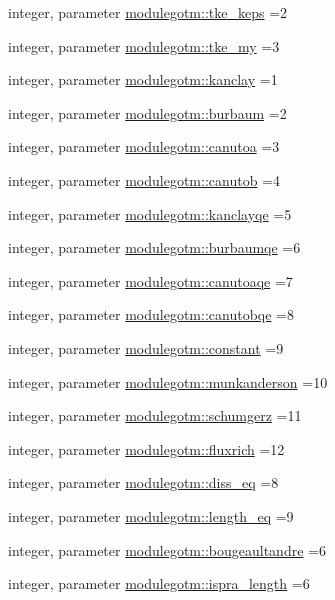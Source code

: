 \begin{DoxyCompactItemize}
integer, parameter \mbox{\hyperlink{namespacemodulegotm_af7d3b24a327afe4fa750141548a9e5f8}{modulegotm\+::tke\+\_\+keps}} =2
\item 
integer, parameter \mbox{\hyperlink{namespacemodulegotm_aed350ab9bde0bdf934d954e5c261a039}{modulegotm\+::tke\+\_\+my}} =3
\item 
integer, parameter \mbox{\hyperlink{namespacemodulegotm_abce18d4dc4ce96034c9b581092bd7970}{modulegotm\+::kanclay}} =1
\item 
integer, parameter \mbox{\hyperlink{namespacemodulegotm_a9ee68515a5fff9c9166a6b82ed456933}{modulegotm\+::burbaum}} =2
\item 
integer, parameter \mbox{\hyperlink{namespacemodulegotm_a08f200dfeb5a1b203cdf3f9887ec48f0}{modulegotm\+::canutoa}} =3
\item 
integer, parameter \mbox{\hyperlink{namespacemodulegotm_ac0ab48f659edad60f836fc9e986a8fec}{modulegotm\+::canutob}} =4
\item 
integer, parameter \mbox{\hyperlink{namespacemodulegotm_a2b67d69c6a8ac1632483b71fcbc9c20a}{modulegotm\+::kanclayqe}} =5
\item 
integer, parameter \mbox{\hyperlink{namespacemodulegotm_acc6f8d4ca9ecc05782e1e5fe37b2a4ea}{modulegotm\+::burbaumqe}} =6
\item 
integer, parameter \mbox{\hyperlink{namespacemodulegotm_a91892f852a1a0e7dbdd26d799d01d3c2}{modulegotm\+::canutoaqe}} =7
\item 
integer, parameter \mbox{\hyperlink{namespacemodulegotm_a1adf4ea0176bd82b7aa9864f7d8aaf83}{modulegotm\+::canutobqe}} =8
\item 
integer, parameter \mbox{\hyperlink{namespacemodulegotm_a4d0033e085531c87c93b030f6591c704}{modulegotm\+::constant}} =9
\item 
integer, parameter \mbox{\hyperlink{namespacemodulegotm_aefc13e1296f71005638e19eff270dd6a}{modulegotm\+::munkanderson}} =10
\item 
integer, parameter \mbox{\hyperlink{namespacemodulegotm_a8b80733c09f1d2f777468f16b9df9563}{modulegotm\+::schumgerz}} =11
\item 
integer, parameter \mbox{\hyperlink{namespacemodulegotm_a1844fb45e0887b6144045352f62f1af5}{modulegotm\+::fluxrich}} =12
\item 
integer, parameter \mbox{\hyperlink{namespacemodulegotm_a4403b4cce1e34ad86c1aa0e705d4222c}{modulegotm\+::diss\+\_\+eq}} =8
\item 
integer, parameter \mbox{\hyperlink{namespacemodulegotm_a090551467cbb9673b88edf6c5db10b2b}{modulegotm\+::length\+\_\+eq}} =9
\item 
integer, parameter \mbox{\hyperlink{namespacemodulegotm_a55510aacb7d64ac380e762ba61964376}{modulegotm\+::bougeaultandre}} =6
\item 
integer, parameter \mbox{\hyperlink{namespacemodulegotm_a8de26216ba29e73b224d20ca6cb44664}{modulegotm\+::ispra\+\_\+length}} =6
\end{DoxyCompactItemize}
